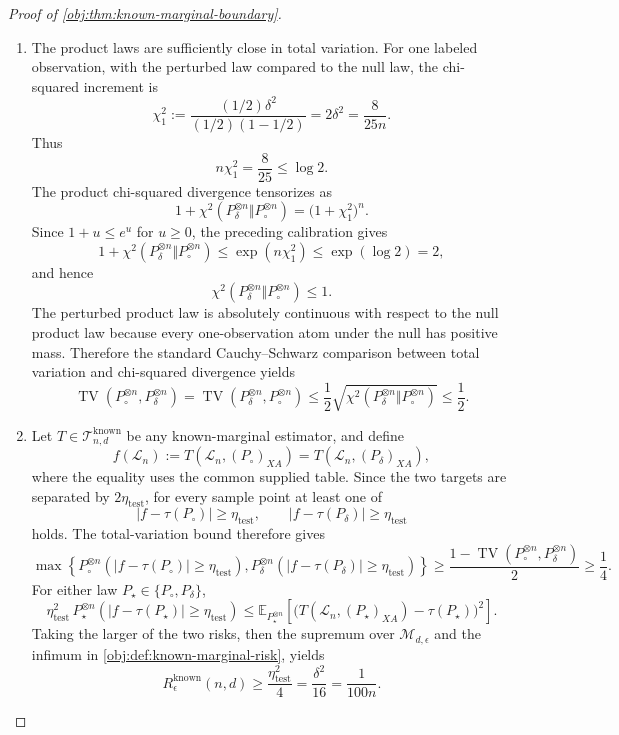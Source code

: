 \begin{proof}[Proof of \cref{obj:thm:known-marginal-boundary}]
\begin{enumerate}
\item
The product laws are sufficiently close in total variation.  For one labeled observation, with the perturbed law compared to the null law, the chi-squared increment is
\[
\chi_1^2
:=
\frac{(1/2)\delta^2}{(1/2)(1-1/2)}
=2\delta^2
=\frac{8}{25n}.
\]
Thus
\[
n\chi_1^2=\frac{8}{25}\le \log 2 .
\]
The product chi-squared divergence tensorizes as
\[
1+\chi^2\!\left(P_{\delta}^{\otimes n}\Vert P_{\circ}^{\otimes n}\right)
=\bigl(1+\chi_1^2\bigr)^n .
\]
Since \(1+u\le e^u\) for \(u\ge0\), the preceding calibration gives
\[
1+\chi^2\!\left(P_{\delta}^{\otimes n}\Vert P_{\circ}^{\otimes n}\right)
\le
\exp(n\chi_1^2)
\le
\exp(\log 2)=2,
\]
and hence
\[
\chi^2\!\left(P_{\delta}^{\otimes n}\Vert P_{\circ}^{\otimes n}\right)
\le 1.
\]
The perturbed product law is absolutely continuous with respect to the null product law because every one-observation atom under the null has positive mass.  Therefore the standard Cauchy--Schwarz comparison between total variation and chi-squared divergence yields
\[
\operatorname{TV}\!\left(P_{\circ}^{\otimes n},P_{\delta}^{\otimes n}\right)
=
\operatorname{TV}\!\left(P_{\delta}^{\otimes n},P_{\circ}^{\otimes n}\right)
\le
\frac12
\sqrt{\chi^2\!\left(P_{\delta}^{\otimes n}\Vert P_{\circ}^{\otimes n}\right)}
\le \frac12 .
\]

\item
Let \(T\in\mathcal T^{\mathrm{known}}_{n,d}\) be any known-marginal estimator, and define
\[
f(\mathcal L_n):=
T\!\left(\mathcal L_n,(P_{\circ})_{XA}\right)
=
T\!\left(\mathcal L_n,(P_{\delta})_{XA}\right),
\]
where the equality uses the common supplied table.  Since the two targets are separated by \(2\eta_{\mathrm{test}}\), for every sample point at least one of
\[
\bigl|f-\tau(P_{\circ})\bigr|\ge \eta_{\mathrm{test}},
\qquad
\bigl|f-\tau(P_{\delta})\bigr|\ge \eta_{\mathrm{test}}
\]
holds.  The total-variation bound therefore gives
\[
\max\!\left\{
P_{\circ}^{\otimes n}\!\left(\bigl|f-\tau(P_{\circ})\bigr|\ge \eta_{\mathrm{test}}\right),
P_{\delta}^{\otimes n}\!\left(\bigl|f-\tau(P_{\delta})\bigr|\ge \eta_{\mathrm{test}}\right)
\right\}
\ge \frac{1-\operatorname{TV}(P_{\circ}^{\otimes n},P_{\delta}^{\otimes n})}{2}
\ge \frac14 .
\]
For either law \(P_\star\in\{P_{\circ},P_{\delta}\}\),
\[
\eta_{\mathrm{test}}^2\,
P_\star^{\otimes n}\!\left(\bigl|f-\tau(P_\star)\bigr|\ge \eta_{\mathrm{test}}\right)
\le
\mathbb E_{P_\star^{\otimes n}}
\!\left[\bigl(T(\mathcal L_n,(P_\star)_{XA})-\tau(P_\star)\bigr)^2\right].
\]
Taking the larger of the two risks, then the supremum over \(\mathcal M_{d,\epsilon}\) and the infimum in \cref{obj:def:known-marginal-risk}, yields
\[
R_\epsilon^{\mathrm{known}}(n,d)
\ge
\frac{\eta_{\mathrm{test}}^2}{4}
=
\frac{\delta^2}{16}
=
\frac{1}{100n}.
\]


\end{enumerate}
\end{proof}
